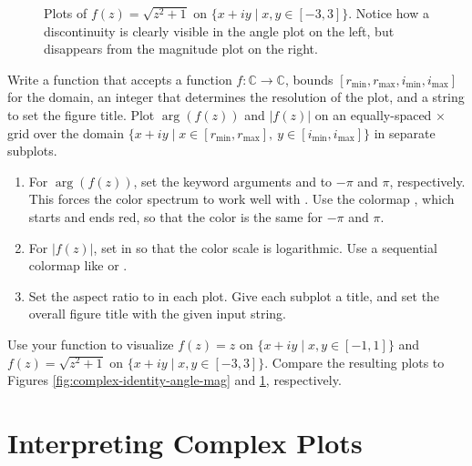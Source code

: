 \begin{figure}[H]
\begin{subfigure}{.49\textwidth}
\end{subfigure}
\caption{Plots of $f(z) = \sqrt{z^2+1}$ on $\{x+iy \mid x,y \in [-3,3]\}$.
Notice how a discontinuity is clearly visible in the angle plot on the left, but disappears from the magnitude plot on the right.}
\label{fig:complex-discontinuity}
\end{figure}

\begin{problem}
Write a function that accepts a function $f:\mathbb{C}\rightarrow\mathbb{C}$,  bounds $[r_{\text{min}},r_{\text{max}},i_{\text{min}},i_{\text{max}}]$ for the domain, an integer  that determines the resolution of the plot, and a string to set the figure title.
Plot $\arg(f(z))$ and $|f(z)|$ on an equally-spaced $\times$ grid over the domain $\{x + iy \mid x \in [r_{\text{min}},r_{\text{max}}],\: y \in [i_{\text{min}},i_{\text{max}}]\}$ in separate subplots.
\begin{enumerate}
\item For $\arg(f(z))$, set the  keyword arguments  and  to $-\pi$ and $\pi$, respectively.
This forces the color spectrum to work well with .
Use the colormap , which starts and ends red, so that the color is the same for $-\pi$ and $\pi$.

\item For $|f(z)|$, set  in  so that the color scale is logarithmic.
Use a sequential colormap like  or .

\item Set the aspect ratio to  in each plot.
Give each subplot a title, and set the overall figure title with the given input string.
\end{enumerate}

Use your function to visualize $f(z) = z$ on $\{x+iy \mid x,y \in [-1,1]\}$ and $f(z) = \sqrt{z^2+1}$ on $\{x+iy \mid x,y \in [-3,3]\}$.
Compare the resulting plots to Figures \ref{fig:complex-identity-angle-mag} and \ref{fig:complex-discontinuity}, respectively.
\label{prob:complex-plotting-function}
\end{problem}

\section*{Interpreting Complex Plots} %

